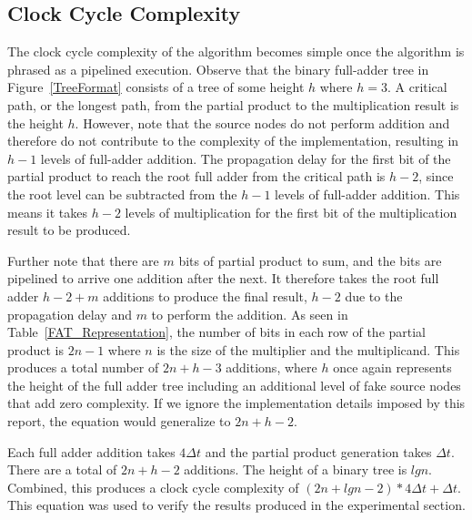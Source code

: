 \documentclass{article}
\begin{document}
\subsection{Clock Cycle Complexity}
The clock cycle complexity of the algorithm becomes simple once the algorithm is phrased as a pipelined execution. Observe that the binary full-adder tree in Figure~\ref{TreeFormat} consists of a tree of some height $h$ where $h = 3$. A critical path, or the longest path, from the partial product to the multiplication result is the height $h$. However, note that the source nodes do not perform addition and therefore do not contribute to the complexity of the implementation, resulting in $h-1$ levels of full-adder addition. The propagation delay for the first bit of the partial product to reach the root full adder from the critical path is $h-2$, since the root level can be subtracted from the $h-1$ levels of full-adder addition. This means it takes $h-2$ levels of multiplication for the first bit of the multiplication result to be produced.

Further note that there are $m$ bits of partial product to sum, and the bits are pipelined to arrive one addition after the next. It therefore takes the root full adder $h-2+m$ additions to produce the final result, $h-2$ due to the propagation delay and $m$ to perform the addition. As seen in Table~\ref{FAT_Representation}, the number of bits in each row of the partial product is $2n-1$ where $n$ is the size of the multiplier and the multiplicand. This produces a total number of $2n+h-3$ additions, where $h$ once again represents the height of the full adder tree including an additional level of fake source nodes that add zero complexity. If we ignore the implementation details imposed by this report, the equation would generalize to $2n+h-2$.

Each full adder addition takes $4\Delta t$ and the partial product generation takes $\Delta t$. There are a total of $2n+h-2$ additions. The height of a binary tree is $lgn$. Combined, this produces a clock cycle complexity of $(2n+lgn-2)*4\Delta t + \Delta t$. This equation was used to verify the results produced in the experimental section.
\end{document}
